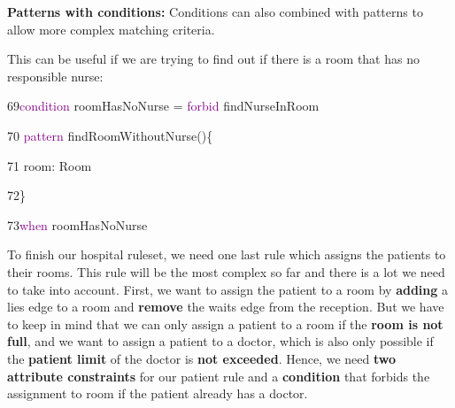 \textbf{Patterns with conditions:}\newline
Conditions can also combined with patterns to allow more complex matching criteria.

This can be useful if we are trying to find out if there is a room that has no responsible nurse:\newline

{

69\hspace{0.5cm}\textcolor{Purple}{condition} roomHasNoNurse = \textcolor{Purple}{forbid} findNurseInRoom

70 \hspace{0.5cm}\textcolor{Purple}{pattern} findRoomWithoutNurse()\{  

71\hspace{1cm} room: Room

72\hspace{0.5cm}\}

73\hspace{0.5cm}\textcolor{Purple}{when} roomHasNoNurse\newline\newline

}


\clearpage

To finish our hospital ruleset, we need one last rule which assigns the patients to their rooms. This rule will be the most complex so far and there is a lot we need to take into account.\newline
First, we want to assign the patient to a room by \textbf{adding} a \textsf{lies} edge to a room and \textbf{remove} the \textsf{waits} edge from the reception.\newline
But we have to keep in mind that we can only assign a patient to a room if the \textbf{room is not full}, and we want to assign a patient to a doctor, which is also only possible if the \textbf{patient limit} of the doctor is \textbf{not exceeded}. Hence, we need \textbf{two attribute constraints} for our patient rule and a \textbf{condition} that forbids the assignment to room if the patient already has a doctor.\newline\newline

